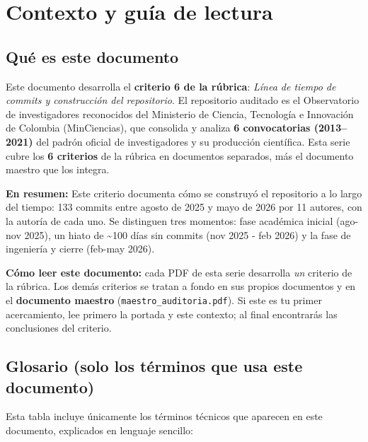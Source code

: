 \section{Contexto y guía de lectura}

\subsection{Qué es este documento}

Este documento desarrolla el \textbf{criterio 6 de la rúbrica}:
\emph{Línea de tiempo de commits y construcción del repositorio}. El repositorio auditado es el
Observatorio de investigadores reconocidos del Ministerio de Ciencia,
Tecnología e Innovación de Colombia (MinCiencias), que consolida y analiza
\textbf{6 convocatorias (2013--2021)} del padrón oficial de investigadores
y su producción científica. Esta serie cubre los \textbf{6 criterios} de la
rúbrica en documentos separados, más el documento maestro que los integra.

\textbf{En resumen:} Este criterio documenta cómo se construyó el repositorio a lo largo del tiempo: 133 commits entre agosto de 2025 y mayo de 2026 por 11 autores, con la autoría de cada uno. Se distinguen tres momentos: fase académica inicial (ago-nov 2025), un hiato de \textasciitilde{}100 días sin commits (nov 2025 - feb 2026) y la fase de ingeniería y cierre (feb-may 2026).




\begin{tcolorbox}[nota]
\textbf{Cómo leer este documento:} cada PDF de esta serie desarrolla \emph{un}
criterio de la rúbrica. Los demás criterios se tratan a fondo en sus propios
documentos y en el \textbf{documento maestro} (\texttt{maestro\_auditoria.pdf}).
Si este es tu primer acercamiento, lee primero la portada y este contexto; al
final encontrarás las conclusiones del criterio.
\end{tcolorbox}

\subsection{Glosario (solo los términos que usa este documento)}

Esta tabla incluye únicamente los términos técnicos que aparecen en este
documento, explicados en lenguaje sencillo:

